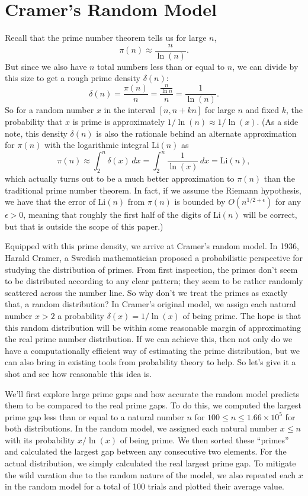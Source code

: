 \documentclass[conference]{IEEEtran}
\begin{document}
\section{Cramer's Random Model}
Recall that the prime number theorem tells us for
large $n$,
\[\pi(n) \approx \frac{n}{\ln(n)}.\]
But since we also have $n$ total numbers less than or equal to
$n$, we can divide by this size to get a rough prime density
$\delta(n)$:
\[\delta(n) = \frac{\pi(n)}{n} = \frac{\frac{n}{\ln{n}}}{n} = \frac{1}{\ln(n)}.\]
So for a random number $x$ in the interval $[n, n + kn]$ for
large $n$ and fixed $k$, the probability that $x$ is prime is
approximately $1 / \ln(n) \approx 1 / \ln(x)$. (As a side note, this
density $\delta(n)$ is also the rationale behind an alternate
approximation for $\pi(n)$ with the logarithmic integral
$\text{Li}(n)$ as
\[\pi(n) \approx \int_2^{n} \delta(x)\, dx = \int_2^{n} \frac{1}{\ln(x)}\, dx = \text{Li}(n),\]
which actually turns out to be a much better approximation to
$\pi(n)$ than the traditional prime number theorem. In
fact, if we assume the
Riemann hypothesis, we have that the error of $\text{Li}(n)$ from
$\pi(n)$ is bounded by $O(n^{1/2 + \epsilon})$ for any
$\epsilon > 0$, meaning that roughly the first half of the
digits of
$\text{Li}(n)$ will be correct,
but that is outside the scope of this paper.)

Equipped with this prime density, we arrive at
Cramer's random model. In 1936, Harald Cramer, a Swedish mathematician
proposed a probabilistic perspective for studying
the distribution of primes. From first inspection,
the primes don't seem to be distributed according to
any clear pattern; they seem to be rather randomly
scattered across the number line. So why don't
we treat the primes as exactly that, a random distribution?
In Cramer's original model, we assign each natural number
$x > 2$ a probability $\delta(x) = 1/\ln(x)$ of being prime.
The hope is that this random distribution will be within
some reasonable margin of approximating the real prime
number distribution. If we can achieve this, then not only
do we have a computationally efficient way of
estimating the prime distribution, but we can also bring
in existing tools from probability theory to help. So
let's give it a shot and see how reasonable this idea is.

We'll first explore large prime gaps and how accurate the
random model predicts them to be compared to the real
prime gaps. To do this, we computed the largest prime gap
less than or equal to a natural number $n$ for
$100 \le n \le 1.66 \times 10^5$ for both distributions.
In the random model, we assigned each natural number $x \le n$
with its probability $x/\ln(x)$ of being prime. We then sorted
these ``primes'' and calculated the largest gap between
any consecutive two elements. For the actual distribution, we
simply calculated the real largest prime gap. To mitigate the wild
varation due to the random nature of the model, we also repeated
each $x$ in the random model for a total of 100 trials and
plotted their average value.
\end{document}
